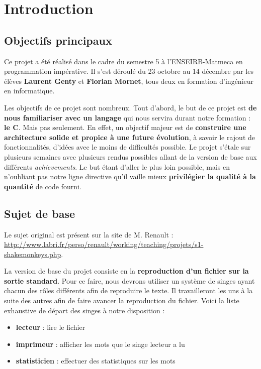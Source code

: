 \documentclass{article}
\begin{document}
\newpage
\tableofcontents

\listoffigures


\newpage
\section{Introduction}
\label{sct:introduction}


\subsection{Objectifs principaux}
\label{subct:obj_principaux}

Ce projet a été réalisé dans le cadre du semestre 5 à l'ENSEIRB-Matmeca en programmation impérative. Il s'est déroulé du 23 octobre au 14 décembre par les élèves \textbf{Laurent Genty} et \textbf{Florian Mornet}, tous deux en formation d'ingénieur en informatique.

Les objectifs de ce projet sont nombreux. Tout d'abord, le but de ce projet est \textbf{de nous familiariser avec un langage} qui nous servira durant notre formation : \textbf{le C}. Mais pas seulement. En effet, un objectif majeur est de \textbf{construire une architecture solide et propice à une future évolution}, à savoir le rajout de fonctionnalités, d'idées avec le moins de difficultés possible.
Le projet s'étale sur plusieurs semaines avec plusieurs rendus possibles allant de la version de base aux différents \textit{achievements}. Le but étant d'aller le plus loin possible, mais en n'oubliant pas notre ligne directive qu'il vaille mieux \textbf{privilégier la qualité à la quantité} de code fourni.


\subsection{Sujet de base}
\label{sct:sujet_base}

Le sujet original est présent sur la site de M. Renault : \url{http://www.labri.fr/perso/renault/working/teaching/projets/s1-shakemonkeys.php}.

La version de base du projet consiste en la \textbf{reproduction d'un fichier sur la sortie standard}. Pour ce faire, nous devrons utiliser un système de singes ayant chacun des rôles différents afin de reproduire le texte. Il travailleront les uns à la suite des autres afin de faire avancer la reproduction du fichier. Voici la liste exhaustive de départ des singes à notre disposition :
\begin{itemize}
    \item \textbf{lecteur} : lire le fichier
    \item \textbf{imprimeur} : afficher les mots que le singe lecteur a lu
    \item \textbf{statisticien} : effectuer des statistiques sur les mots
\end{itemize}
\end{document}
